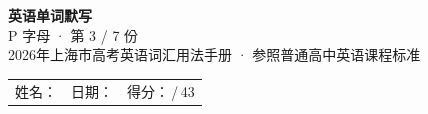 \documentclass[10pt,a4paper]{article}
\begin{document}
\pagestyle{plain}

\begin{center}
{\LARGE\bfseries 英语单词默写}\\[0.22em]
{\large P 字母 · 第 3 / 7 份}\\[0.18em]
{\small 2026年上海市高考英语词汇用法手册 · 参照普通高中英语课程标准}
\end{center}

\vspace{0.25em}
\noindent\begin{tabular}{@{}p{}@{}p{}@{}p{}@{}}
姓名：\underline{\hspace{2.0cm}} & 日期：\underline{\hspace{2.0cm}} & 得分：\underline{\hspace{1.3cm}}\,/\,43 \\
\end{tabular}

\vspace{0.3em}

\vspace{0.08em}
\end{document}
